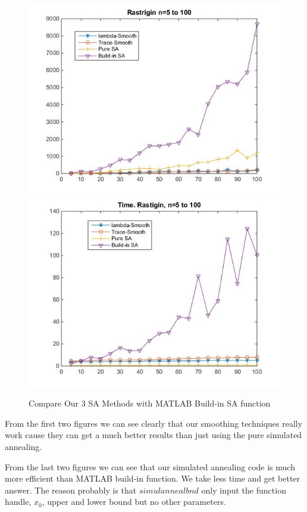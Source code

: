 \documentclass[letterpaper,12pt,titlepage,oneside,final]{book}
\begin{document}
\begin{figure}[H]
\includegraphics[scale=0.7]{rast4.jpg}
\includegraphics[scale=0.7]{rast5.jpg}
\caption{Compare Our 3 SA Methods with MATLAB Build-in SA function}
\end{figure}

From the first two figures we can see clearly that our smoothing techniques really work cause they can get a much better results than just using the pure simulated annealing.

From the last two figures we can see that our simulated annealing code is much more efficient than MATLAB build-in function. We take less time and get better answer. The reason probably is that $simulannealbnd$ only input the function handle, $x_0$, upper and lower bound but no other parameters.
\end{document}
